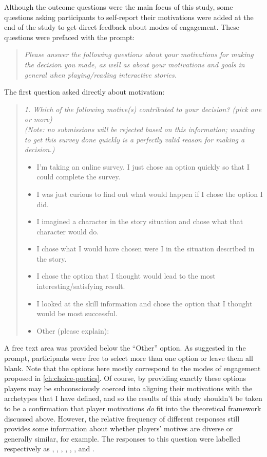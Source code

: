 Although the outcome questions were the main focus of this study, some questions asking participants to self-report their motivations were added at the end of the study to get direct feedback about modes of engagement.
%
These questions were prefaced with the prompt:
%
\begin{quote}
  \slshape
Please answer the following questions about your motivations for making the decision you made, as well as about your motivations and goals in general when playing/reading interactive stories.
\end{quote}
%
The first question asked directly about motivation:
%
\begin{quote}
  \slshape
  1. Which of the following motive(s) contributed to your decision? (pick one or more) \\
  (Note: no submissions will be rejected based on this information; wanting to get this survey done quickly is a perfectly valid reason for making a decision.) \\
  \begin{itemize}
    \item[\ding{111}] I'm taking an online survey. I just chose an option quickly so that I could complete the survey.
    \item[\ding{111}] I was just curious to find out what would happen if I chose the option I did.
    \item[\ding{111}] I imagined a character in the story situation and chose what that character would do.
    \item[\ding{111}] I chose what I would have chosen were I in the situation described in the story.
    \item[\ding{111}] I chose the option that I thought would lead to the most interesting/satisfying result.
    \item[\ding{111}] I looked at the skill information and chose the option that I thought would be most successful.
    \item[\ding{111}] Other (please explain):
  \end{itemize}
\end{quote}
%
A free text area was provided below the ``Other'' option.
%
As suggested in the prompt, participants were free to select more than one option or leave them all blank.
%
Note that the options here mostly correspond to the modes of engagement proposed in \cref{ch:choice-poetics}.
%
Of course, by providing exactly these options players may be subconsciously coerced into aligning their motivations with the archetypes that I have defined, and so the results of this study shouldn't be taken to be a confirmation that player motivations \emph{do} fit into the theoretical framework discussed above.
%
However, the relative frequency of different responses still provides some information about whether players' motives are diverse or generally similar, for example.
%
The responses to this question were labelled respectively as , , , , , , and .

